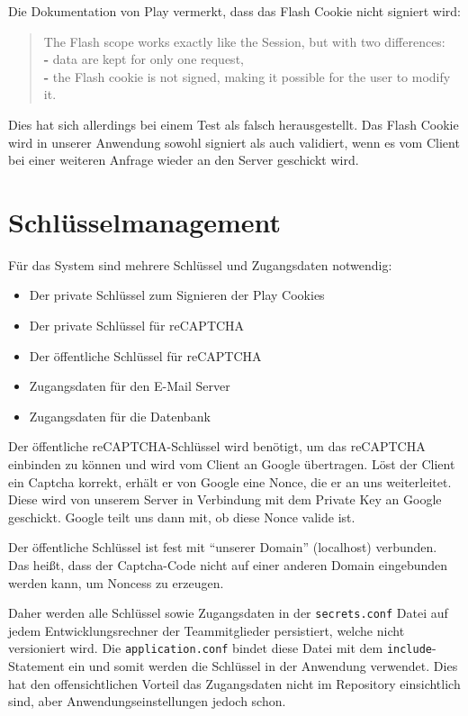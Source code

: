 \documentclass[12pt,DIV14,BCOR10mm,a4paper,parskip=half-,headsepline,headinclude,english,ngerman,bibliography=totocnumbered]{scrreprt}
\begin{document}
Die Dokumentation von Play vermerkt, dass das Flash Cookie nicht signiert wird:
\blockquote{
The Flash scope works exactly like the Session, but with two differences: \\
\textbf{-} data are kept for only one request, \\
\textbf{-} the Flash cookie is not signed, making it possible for the user to modify it. \autocite{JavaPlayFlashDocu}
}
Dies hat sich allerdings bei einem Test als falsch herausgestellt. Das Flash Cookie wird in unserer Anwendung sowohl signiert als auch validiert, wenn es vom Client bei einer weiteren Anfrage wieder an den Server geschickt wird.

\section{Schlüsselmanagement}
Für das System sind mehrere Schlüssel und Zugangsdaten notwendig:

\begin{itemize}
	\item Der private Schlüssel zum Signieren der Play Cookies
	\item Der private Schlüssel für reCAPTCHA
	\item Der öffentliche Schlüssel für reCAPTCHA
	\item Zugangsdaten für den E-Mail Server
	\item Zugangsdaten für die Datenbank
\end{itemize}

Der öffentliche reCAPTCHA-Schlüssel wird benötigt, um das reCAPTCHA einbinden zu können und wird vom Client an Google übertragen. Löst der Client ein Captcha korrekt, erhält er von Google eine Nonce, die er an uns weiterleitet. Diese wird von unserem Server in Verbindung mit dem Private Key an Google geschickt. Google teilt uns dann mit, ob diese Nonce valide ist.

Der öffentliche Schlüssel ist fest mit \enquote{unserer Domain} (localhost) verbunden. Das heißt, dass der Captcha-Code nicht auf einer anderen Domain eingebunden werden kann, um Noncess zu erzeugen.

Daher werden alle Schlüssel sowie Zugangsdaten in der \texttt{secrets.conf} Datei auf jedem Entwicklungsrechner der Teammitglieder persistiert, welche nicht versioniert wird. Die \texttt{application.conf} bindet diese Datei mit dem \texttt{include}-Statement ein und somit werden die Schlüssel in der Anwendung verwendet. Dies hat den offensichtlichen Vorteil das Zugangsdaten nicht im Repository einsichtlich sind, aber Anwendungseinstellungen jedoch schon.
\end{document}
